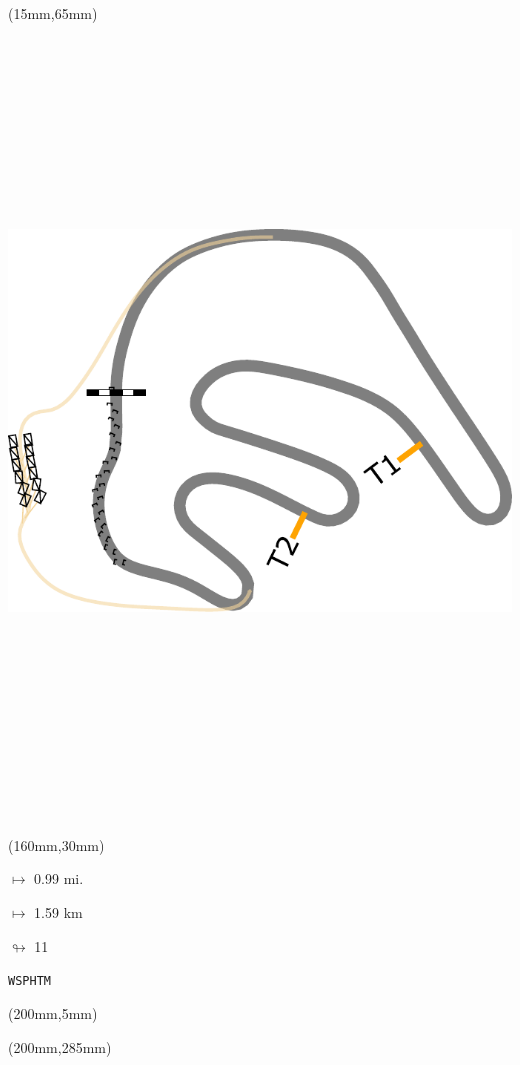 \begin{textblock*}{185mm}(15mm,65mm)%
\centering
\mbox{\includegraphics[width=185mm,height=210mm,keepaspectratio]{PT/WSPHTM.pdf}}
\end{textblock*}
\begin{textblock*}{40mm}(160mm,30mm)%
\Large
\par$\mapsto$ 0.99 mi.
\par$\mapsto$ 1.59 km
\par$\looparrowright$ 11
\par\hfill\tiny\tt WSPHTM\\
\end{textblock*}
\begin{textblock*}{20mm}(200mm,5mm)%
\fbox{\thepage}
\label{WSPHTM}
\end{textblock*}
\begin{textblock*}{20mm}(200mm,285mm)%
\fbox{\thepage}
\end{textblock*}

